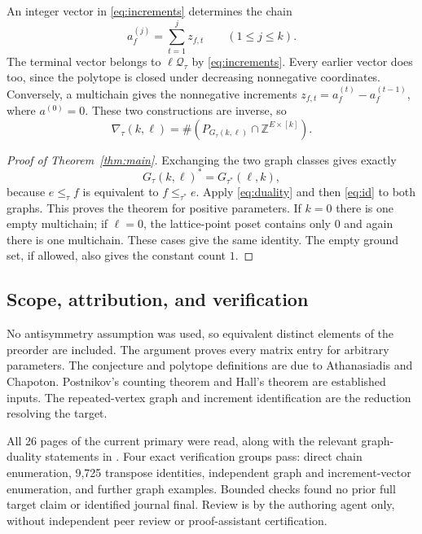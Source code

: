 \documentclass[11pt]{article}
\newcommand{\Z}{\mathbb Z}
\newcommand{\Q}{\mathcal Q}
\begin{document}
An integer vector in \eqref{eq:increments} determines the chain
\begin{equation}\label{eq:chain}
 a_f^{(j)}=\sum_{t=1}^j z_{f,t}\qquad(1\le j\le k).
\end{equation}
The terminal vector belongs to $\ell\Q_\tau$ by
\eqref{eq:increments}. Every earlier vector does too, since
the polytope is closed under decreasing nonnegative coordinates.
Conversely, a multichain gives the nonnegative increments
$z_{f,t}=a_f^{(t)}-a_f^{(t-1)}$, where $a^{(0)}=0$.
These two constructions are inverse, so
\begin{equation}\label{eq:id}
 \nabla_\tau(k,\ell)=\#(P_{G_\tau(k,\ell)}\cap\Z^{E\times[k]}).
\end{equation}

\begin{proof}[Proof of Theorem~\ref{thm:main}]
Exchanging the two graph classes gives exactly
\[
 G_\tau(k,\ell)^*=G_{\tau^*}(\ell,k),
\]
because $e\le_\tau f$ is equivalent to $f\le_{\tau^*}e$.
Apply \eqref{eq:duality} and then \eqref{eq:id} to both graphs.
This proves the theorem for positive parameters. If $k=0$ there
is one empty multichain; if $\ell=0$, the lattice-point poset
contains only $0$ and again there is one multichain. These cases
give the same identity. The empty ground set, if allowed, also
gives the constant count $1$.
\end{proof}

\subsection*{Scope, attribution, and verification}
No antisymmetry assumption was used, so equivalent distinct
elements of the preorder are included. The argument proves every
matrix entry for arbitrary parameters. The conjecture and
polytope definitions are due to Athanasiadis and Chapoton.
Postnikov's counting theorem and Hall's theorem are established
inputs. The repeated-vertex graph and increment identification
are the reduction resolving the target.

All 26 pages of the current primary were read, along with the
relevant graph-duality statements in \cite{D}. Four exact
verification groups pass: direct chain enumeration, 9,725
transpose identities, independent graph and increment-vector
enumeration, and further graph examples. Bounded checks found
no prior full target claim or identified journal final. Review
is by the authoring agent only, without independent peer review
or proof-assistant certification.
\end{document}
